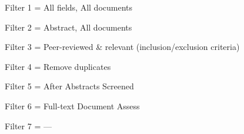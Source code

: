 \begin{table}[htbp]
\begin{threeparttable}
\begin{tabular}{lccccccc}
\bottomrule
\end{tabular}
\begin{tablenotes}
\small
\item Filter 1 = All fields, All documents
\item Filter 2 = Abstract, All documents
\item Filter 3 = Peer-reviewed \& relevant (inclusion/exclusion criteria)
\item Filter 4 = Remove duplicates
\item Filter 5 = After Abstracts Screened
\item Filter 6 = Full-text Document Assess
\item Filter 7 = ---
\end{tablenotes}
\end{threeparttable}
\end{table}